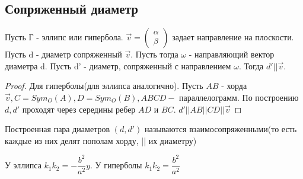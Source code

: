 \subsection{Сопряженный диаметр}
\begin{theorem}
	Пусть Г - эллипс или гипербола. \(\vec v = \begin{pmatrix}
		\alpha \\ \beta
	\end{pmatrix}\) задает направление на плоскости. Пусть d - диаметр сопряженный $\vec{v}$. Пусть тогда \(\omega\) - направляющий вектор диаметра d. Пусть d' - диаметр, сопряженный с направлением \(\omega\). Тогда \(d'||\vec v\).
\end{theorem}
\begin{proof}
	Для гиперболы(для эллипса аналогично). Пусть $AB$ - хорда $\vec{v}, C = Sym_O(A), D = Sym_O(B), ABCD - $ параллелограмм. По построению $d, d'$ проходят через середины ребер $AD$ и $BC$. $d'||AB||CD||\vec{v}$
\end{proof}
\begin{definition}
	Построенная пара диаметров $(d, d')$ называются взаимосопряженными(то есть каждые из них делят пополам хорду, || их диаметру)
\end{definition}
\begin{exercise}
	У эллипса \(k_1k_2 = -\dfrac{b^2}{a^2}y\). У гиперболы \(k_1k_2 = \dfrac{b^2}{a^2}\)
\end{exercise}
